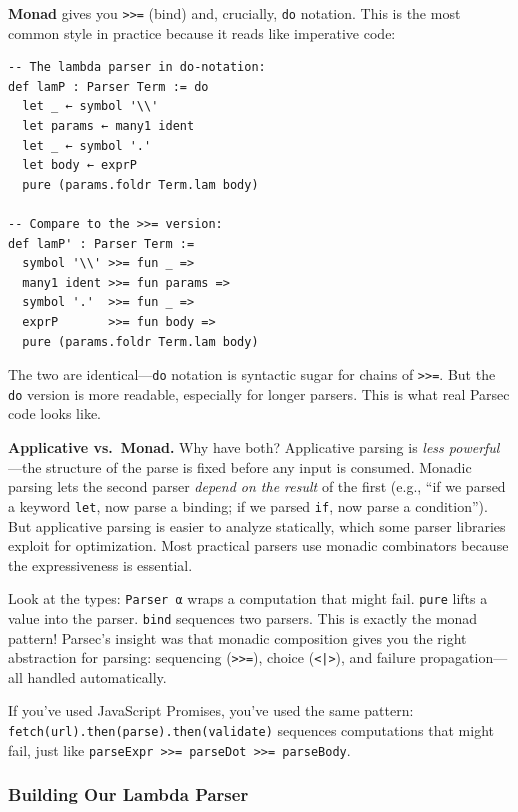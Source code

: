 \documentclass[11pt,a4paper]{article}
\theoremstyle{definition}
\begin{document}
\textbf{Monad} gives you \texttt{>>=} (bind) and, crucially, \texttt{do}
notation. This is the most common style in practice because it reads like
imperative code:

\begin{verbatim}
-- The lambda parser in do-notation:
def lamP : Parser Term := do
  let _ ← symbol '\\'
  let params ← many1 ident
  let _ ← symbol '.'
  let body ← exprP
  pure (params.foldr Term.lam body)

-- Compare to the >>= version:
def lamP' : Parser Term :=
  symbol '\\' >>= fun _ =>
  many1 ident >>= fun params =>
  symbol '.'  >>= fun _ =>
  exprP       >>= fun body =>
  pure (params.foldr Term.lam body)
\end{verbatim}

The two are identical---\texttt{do} notation is syntactic sugar for chains
of \texttt{>>=}. But the \texttt{do} version is more readable, especially for
longer parsers. This is what real Parsec code looks like.

\textbf{Applicative vs.\ Monad.} Why have both? Applicative parsing is
\emph{less powerful}---the structure of the parse is fixed before any input is
consumed. Monadic parsing lets the second parser \emph{depend on the result}
of the first (e.g., ``if we parsed a keyword \texttt{let}, now parse a binding;
if we parsed \texttt{if}, now parse a condition''). But applicative parsing is
easier to analyze statically, which some parser libraries exploit for
optimization. Most practical parsers use monadic combinators because the
expressiveness is essential.

\begin{intuition}
Look at the types: \texttt{Parser α} wraps a computation that might fail.
\texttt{pure} lifts a value into the parser. \texttt{bind} sequences two
parsers. This is exactly the monad pattern! Parsec's insight was that monadic
composition gives you the right abstraction for parsing: sequencing
(\texttt{>>=}), choice (\texttt{<|>}), and failure propagation---all handled
automatically.

If you've used JavaScript Promises, you've used the same pattern:
\texttt{fetch(url).then(parse).then(validate)} sequences computations that
might fail, just like \texttt{parseExpr >>= parseDot >>= parseBody}.
\end{intuition}

\subsubsection{Building Our Lambda Parser}
\end{document}
